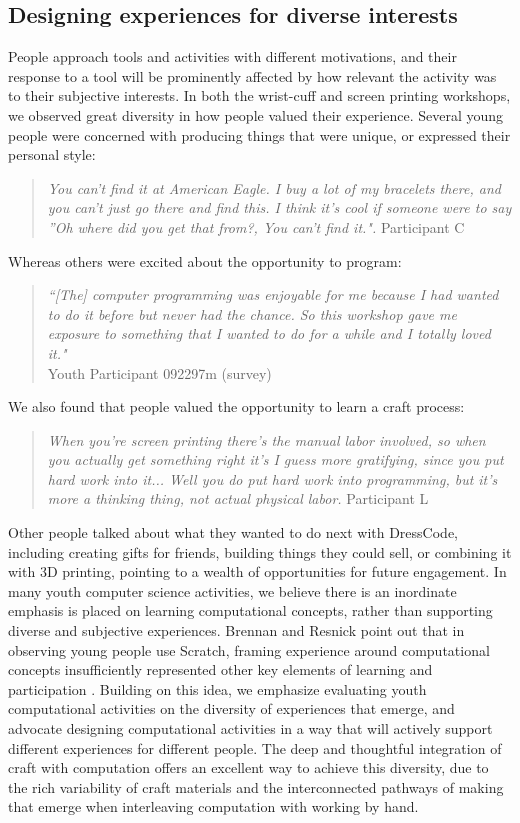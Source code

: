 \documentclass{sigchi}
\begin{document}
\subsection{Designing experiences for diverse interests}
People approach tools and activities with different motivations, and their response to a tool will be prominently affected by how relevant the activity was to their subjective interests. In both the wrist-cuff and screen printing workshops, we observed great diversity in how people valued their experience. Several young people were concerned with producing things that were unique, or expressed their personal style:
\begin{quote}
\textit{You can't find it at American Eagle. I buy a lot of my bracelets there, and you can't just go there and find this. I think it's cool if someone were to say ''Oh where did you get that from?, You can't find it.".}
Participant C
\end{quote}
Whereas others were excited about the opportunity to program:
\begin{quote}
\textit{``[The] computer programming was enjoyable for me because I had wanted to do it before but never had the chance. So this workshop gave me exposure to something that I wanted to do for a while and I totally loved it."}
\\Youth Participant 092297m (survey)
\end{quote}
We also found that people valued the opportunity to learn a craft process:
\begin{quote}
\textit{When you're screen printing there's the manual labor involved, so when you actually get something right it's I guess more gratifying, since you put hard work into it... Well you do put hard work into programming, but it's more a thinking thing, not actual physical labor.}
Participant L
\end{quote}
Other people talked about what they wanted to do next with DressCode, including creating gifts for friends, building things they could sell, or combining it with 3D printing, pointing to a wealth of opportunities for future engagement. In many youth computer science activities, we believe there is an inordinate emphasis is placed on learning computational concepts, rather than supporting diverse and subjective experiences. Brennan and Resnick point out that in observing young people use Scratch, framing experience around computational concepts insufficiently represented other key elements of learning and participation \cite{computational_thinking}. Building on this idea, we emphasize evaluating youth computational activities on the diversity of experiences that emerge, and advocate designing computational activities in a way that will actively support different experiences for different people. The deep and thoughtful integration of craft with computation offers an excellent way to achieve this diversity, due to the rich variability of craft materials and the interconnected pathways of making that emerge when interleaving computation with working by hand. 
\end{document}
